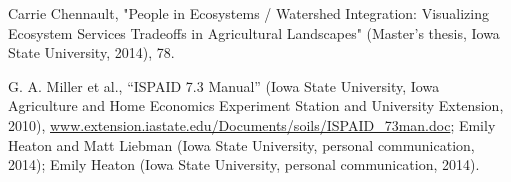 \documentclass[11pt]{article}
\begin{document}
\begin{thebibliography}{1}
  Carrie Chennault, "People in Ecosystems / Watershed Integration: Visualizing Ecosystem Services Tradeoffs in Agricultural Landscapes" (Master’s thesis, Iowa State University, 2014), 78.
  
    G. A. Miller et al., “ISPAID 7.3 Manual” (Iowa State University, Iowa Agriculture and Home Economics Experiment Station and University Extension, 2010), \url{www.extension.iastate.edu/Documents/soils/ISPAID_73man.doc}; Emily Heaton and Matt Liebman (Iowa State University, personal communication, 2014); Emily Heaton (Iowa State University, personal communication, 2014).
\end{thebibliography}
\end{document}
